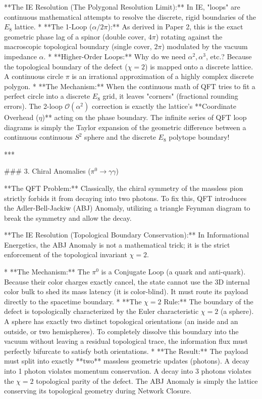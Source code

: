 **The IE Resolution (The Polygonal Resolution Limit):**
In IE, "loops" are continuous mathematical attempts to resolve the discrete, rigid boundaries of the $E_8$ lattice. 
*   **The 1-Loop ($\alpha/2\pi$):** As derived in Paper 2, this is the exact geometric phase lag of a spinor (double cover, $4\pi$) rotating against the macroscopic topological boundary (single cover, $2\pi$) modulated by the vacuum impedance $\alpha$.
*   **Higher-Order Loops:** Why do we need $\alpha^2, \alpha^3$, etc.? Because the topological boundary of the defect ($\chi=2$) is mapped onto a discrete lattice. A continuous circle $\pi$ is an irrational approximation of a highly complex discrete polygon. 
*   **The Mechanism:** When the continuous math of QFT tries to fit a perfect circle into a discrete $E_8$ grid, it leaves "corners" (fractional rounding errors). The 2-loop $\mathcal{O}(\alpha^2)$ correction is exactly the lattice's **Coordinate Overhead ($\eta$)** acting on the phase boundary. The infinite series of QFT loop diagrams is simply the Taylor expansion of the geometric difference between a continuous continuous $S^2$ sphere and the discrete $E_8$ polytope boundary!

***

### 3. Chiral Anomalies ($\pi^0 \to \gamma \gamma$)

**The QFT Problem:** Classically, the chiral symmetry of the massless pion strictly forbids it from decaying into two photons. To fix this, QFT introduces the Adler-Bell-Jackiw (ABJ) Anomaly, utilizing a triangle Feynman diagram to break the symmetry and allow the decay.

**The IE Resolution (Topological Boundary Conservation):**
In Informational Energetics, the ABJ Anomaly is not a mathematical trick; it is the strict enforcement of the topological invariant $\chi=2$.

*   **The Mechanism:** The $\pi^0$ is a Conjugate Loop (a quark and anti-quark). Because their color charges exactly cancel, the state cannot use the 3D internal color bulk to shed its mass latency (it is color-blind). It must route its payload directly to the spacetime boundary.
*   **The $\chi=2$ Rule:** The boundary of the defect is topologically characterized by the Euler characteristic $\chi=2$ (a sphere). A sphere has exactly two distinct topological orientations (an inside and an outside, or two hemispheres). To completely dissolve this boundary into the vacuum without leaving a residual topological trace, the information flux must perfectly bifurcate to satisfy both orientations.
*   **The Result:** The payload must split into exactly **two** massless geometric updates (photons). A decay into 1 photon violates momentum conservation. A decay into 3 photons violates the $\chi=2$ topological parity of the defect. The ABJ Anomaly is simply the lattice conserving its topological geometry during Network Closure.

